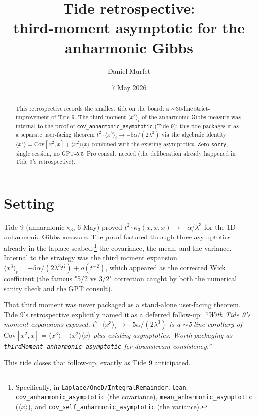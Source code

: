 \documentclass[11pt]{article}
\title{Tide retrospective:\\third-moment asymptotic for the anharmonic Gibbs}
\author{Daniel Murfet}
\date{7 May 2026}
\begin{document}
\maketitle

\begin{abstract}
This retrospective records the smallest tide on the board: a $\sim$30-line
strict-improvement of Tide 9. The third moment $\langle x^3 \rangle_t$ of
the anharmonic Gibbs measure was internal to the proof of
\texttt{cov\_anharmonic\_asymptotic} (Tide 9); this tide packages it as a
separate user-facing theorem
$t^2 \cdot \langle x^3 \rangle_t \to -5\alpha/(2\lambda^3)$ via the
algebraic identity $\langle x^3 \rangle = \mathrm{Cov}[x^2, x] + \langle x^2 \rangle \langle x \rangle$
combined with the existing asymptotics. Zero \texttt{sorry}, single
session, no GPT-5.5~Pro consult needed (the deliberation already happened
in Tide 9's retrospective).
\end{abstract}

\section{Setting}

Tide 9 (anharmonic-$\kappa_3$, 6 May) proved
$t^2 \cdot \kappa_3(x, x, x) \to -\alpha/\lambda^3$ for the 1D anharmonic
Gibbs measure. The proof factored through three asymptotics already in
the laplace seabed:\footnote{Specifically, in
\texttt{Laplace/OneD/IntegralRemainder.lean}:
\texttt{cov\_anharmonic\_asymptotic} (the covariance),
\texttt{mean\_anharmonic\_asymptotic} ($\langle x \rangle$), and
\texttt{cov\_self\_anharmonic\_asymptotic} (the variance).}
the covariance, the mean, and the variance. Internal to the
strategy was the third moment expansion
$\langle x^3 \rangle_t = -5\alpha/(2\lambda^3 t^2) + o(t^{-2})$, which
appeared as the corrected Wick coefficient (the famous "5/2 vs 3/2"
correction caught by both the numerical sanity check and the GPT consult).

That third moment was never packaged as a stand-alone user-facing
theorem. Tide 9's retrospective explicitly named it as a deferred
follow-up: \emph{``With Tide 9's moment expansions exposed,
$t^2 \cdot \langle x^3 \rangle_t \to -5\alpha/(2\lambda^3)$ is a $\sim$5-line
corollary of $\mathrm{Cov}[x^2, x] = \langle x^3 \rangle - \langle x^2 \rangle \langle x \rangle$
plus existing asymptotics. Worth packaging as
\texttt{thirdMoment\_anharmonic\_asymptotic} for downstream consistency.''}

This tide closes that follow-up, exactly as Tide 9 anticipated.
\end{document}
